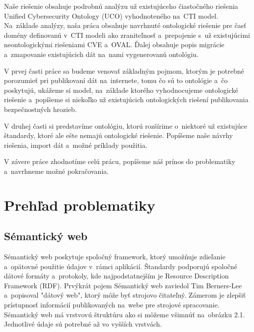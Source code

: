 \documentclass[12pt, a4paper, oneside]{book}
\begin{document}

Naše riešenie obsahuje podrobnú analýzu už existujúceho čiastočného riešenia Unified Cybersecurity Ontology (UCO) \citep{ucoSource}  vyhodnoteného na~CTI model. Na~základe analýzy, naša práca obsahuje navrhnuté ontologické riešenie pre časť domény definovanú v~CTI modeli ako zraniteľnosť a~prepojenie s~už existujúcimi neontologickými riešeniami CVE a~OVAL. Ďalej obsahuje popis migrácie a~zmapovanie existujúcich dát na~nami vygenerovanú ontológiu.


V prvej časti práce sa budeme venovať základným pojmom, ktorým je potrebné porozumieť pri publikovaní dát na~internete, tomu čo sú to ontológie a~čo poskytujú, ukážeme si model, na~základe ktorého vyhodnocujeme ontologické riešenie a~popíšeme si niekoľko už existujúcich ontologických riešení publikovania bezpečnostných hrozieb.


V druhej časti si predstavíme ontológiu, ktorú rozšírime o~niektoré už existujúce štandardy, ktoré ale ešte nemajú ontologické riešenie. Popíšeme naše návrhy riešenia, import dát a~možné príklady použitia.


V závere práce zhodnotíme celú prácu, popíšeme náš prínos do problematiky a~navrhneme možné pokračovania.




\part{Prehľad problematiky}
\chapter{Sémantický web}
Sémantický web \cite{semantic} poskytuje spoločný framework, ktorý umožňuje zdieľanie a~opätovné použitie údajov v~rámci aplikácií. Štandardy podporujú spoločné dátové formáty a~protokoly, kde najpodstatnejším je Resource Description Framework (RDF). Prvýkrát pojem Sémantický web zaviedol Tim Berners-Lee a~popisoval "dátový web", ktorý môže byť strojovo čitateľný. Zámerom je zlepšiť prístupnosť informácií publikovaných na~webe pre strojové spracovanie. Sémantický web má vrstvovú štruktúru ako si môžeme všimnúť na~obrázku 2.1. Jednotlivé údaje sú potrebné až vo vyšších vrstvách. 
\end{document}
